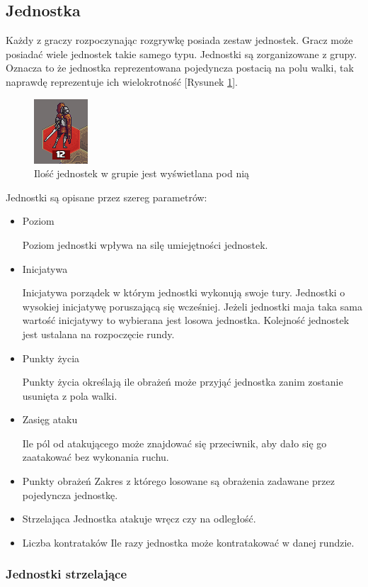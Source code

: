 \documentclass[letterpaper,12pt]{article}
\begin{document}
\subsection{Jednostka}
Każdy z graczy rozpoczynając rozgrywkę posiada zestaw jednostek. Gracz może posiadać wiele jednostek takie samego typu. Jednostki są zorganizowane z grupy. Oznacza to że jednostka reprezentowana pojedyncza postacią na polu walki, tak naprawdę reprezentuje ich wielokrotność [Rysunek \ref{fig:unit}].
\begin{figure}[h!]
 \centering
  \includegraphics[scale=1.2]{unit.png}
  \caption{Ilość jednostek w grupie jest wyświetlana pod nią}
  \label{fig:unit}
\end{figure}

Jednostki są opisane przez szereg parametrów:
\begin{itemize}  
\item Poziom
\par Poziom jednostki wpływa na silę umiejętności jednostek.
\item Inicjatywa
\par Inicjatywa porządek w którym jednostki wykonują swoje tury. Jednostki o wysokiej inicjatywę poruszającą się wcześniej. Jeżeli jednostki maja taka sama wartość inicjatywy to wybierana jest losowa jednostka. Kolejność jednostek jest ustalana na rozpoczęcie rundy.
\item Punkty życia
\par Punkty życia określają ile obrażeń może przyjąć jednostka zanim zostanie usunięta z pola walki. 
\item Zasięg ataku
\par Ile pól od atakującego może znajdować się przeciwnik, aby dało się go zaatakować bez wykonania ruchu.
\item Punkty obrażeń
Zakres z którego losowane są obrażenia zadawane przez pojedyncza jednostkę.
\item Strzelająca
Jednostka atakuje wręcz czy na odległość.
\item Liczba kontrataków 
Ile razy jednostka może kontratakować w danej rundzie.
\end{itemize}
\subsubsection {Jednostki strzelające}
\end{document}
